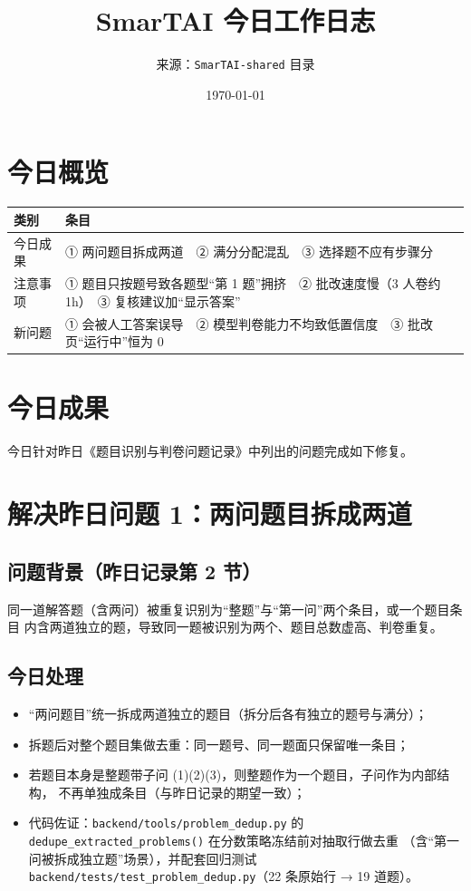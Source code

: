 \documentclass[12pt,a4paper]{ctexart}
\title{\bfseries SmarTAI 今日工作日志}
\author{来源：\texttt{SmarTAI-shared} 目录}
\date{\today}
\begin{document}
\maketitle
\sloppy

\section*{今日概览}

\begin{center}
\begin{tabular}{@{}p{3.2cm}p{11.2cm}@{}}
\toprule
类别 & 条目 \\
\midrule
今日成果 & ① 两问题目拆成两道　② 满分分配混乱　③ 选择题不应有步骤分 \\
注意事项 & ① 题目只按题号致各题型“第 1 题”拥挤　② 批改速度慢（3 人卷约 1h）　③ 复核建议加“显示答案” \\
新问题   & ① 会被人工答案误导　② 模型判卷能力不均致低置信度　③ 批改页“运行中”恒为 0 \\
\bottomrule
\end{tabular}
\end{center}

\section*{今日成果}

今日针对昨日《题目识别与判卷问题记录》中列出的问题完成如下修复。

\section{解决昨日问题 1：两问题目拆成两道}

\subsection{问题背景（昨日记录第 2 节）}
同一道解答题（含两问）被重复识别为“整题”与“第一问”两个条目，或一个题目条目
内含两道独立的题，导致同一题被识别为两个、题目总数虚高、判卷重复。

\subsection{今日处理}
\begin{itemize}[leftmargin=2em]
  \item “两问题目”统一拆成两道独立的题目（拆分后各有独立的题号与满分）；
  \item 拆题后对整个题目集做去重：同一题号、同一题面只保留唯一条目；
  \item 若题目本身是整题带子问 (1)(2)(3)，则整题作为一个题目，子问作为内部结构，
        不再单独成条目（与昨日记录的期望一致）；
  \item 代码佐证：\texttt{backend/tools/problem\_dedup.py} 的
        \texttt{dedupe\_extracted\_problems()} 在分数策略冻结前对抽取行做去重
        （含“第一问被拆成独立题”场景），并配套回归测试
        \texttt{backend/tests/test\_problem\_dedup.py}（22 条原始行 → 19 道题）。
\end{itemize}
\end{document}
